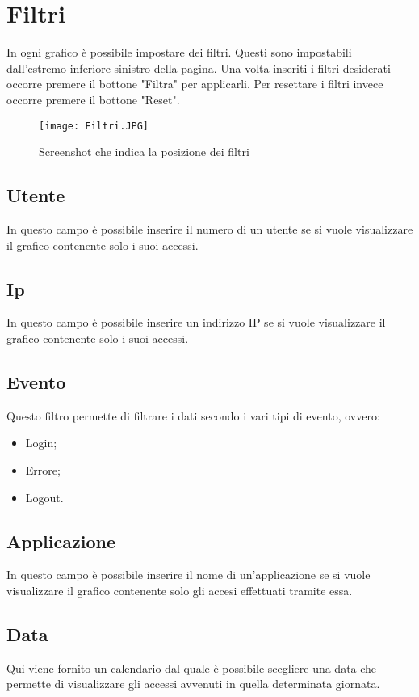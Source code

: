 \section{Filtri}
In ogni grafico è possibile impostare dei filtri. Questi sono impostabili dall'estremo inferiore sinistro della pagina. Una volta inseriti i filtri desiderati occorre premere il bottone "Filtra" per applicarli. Per resettare i filtri invece occorre premere il bottone "Reset".

\begin{figure}[H]
    \texttt{[image: Filtri.JPG]}
    \caption{Screenshot che indica la posizione dei filtri}
\end{figure}

\subsection{Utente}
In questo campo è possibile inserire il numero di un utente se si vuole visualizzare il grafico contenente solo i suoi accessi.

\subsection{Ip}
In questo campo è possibile inserire un indirizzo IP se si vuole visualizzare il grafico contenente solo i suoi accessi.

\subsection{Evento}
Questo filtro permette di filtrare i dati secondo i vari tipi di evento, ovvero:
\begin{itemize}
  \item Login;
  \item Errore;
  \item Logout.
\end{itemize}

\subsection{Applicazione}
In questo campo è possibile inserire il nome di un'applicazione se si vuole visualizzare il grafico contenente solo gli accesi effettuati tramite essa.

\subsection{Data}
Qui viene fornito un calendario dal quale è possibile scegliere una data che permette di visualizzare gli accessi avvenuti in quella determinata giornata.

